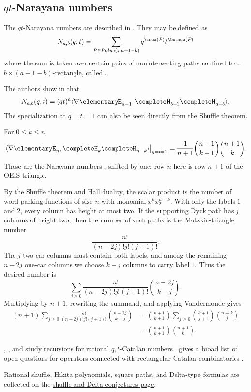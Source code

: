\subsection[narayanaNumbers]{$qt$-Narayana numbers}


The $qt$-Narayana numbers are described in
\cite{AvalDAdderioDukesHicksBorgne2014}.
They may be defined as
\[
N_{a,b}(q,t) = \sum_{P \in Polyo(b,a+1-b)} q^{\area(P)}t^{\bounce(P)}
\]
where the sum is taken over certain pairs of
\hyperref[lgvLemma]{nonintersecting paths} confined to
a $b \times (a+1-b)$-rectangle, called
\label{parallelogramPolyomino}.

The authors show in \cite[Thm.~6.1]{AvalDAdderioDukesHicksBorgne2014} that
\[
N_{a,b}(q,t) =
(qt)^{a} \langle \nabla \elementaryE_{a-1}, \completeH_{b-1} \completeH_{a-b} \rangle.
\]
The specialization at \(q=t=1\) can also be seen directly from the Shuffle
theorem.
\begin{proposition}[Narayana coefficient at \(q=t=1\)]
For \(0\leq k\leq n\),
\[
\left.
\langle \nabla \elementaryE_n,\completeH_k\completeH_{n-k}\rangle
\right|_{q=t=1}
=
\frac{1}{n+1}\binom{n+1}{k+1}\binom{n+1}{k}.
\]
These are the Narayana numbers , shifted by one: row \(n\)
here is row \(n+1\) of the OEIS triangle.
\end{proposition}
\begin{proof*}
By the Shuffle theorem and Hall duality, the scalar product is the number of
\hyperref[wordParkingFunctionDefinition]{word parking functions} of size \(n\)
with monomial \(x_1^k x_2^{n-k}\).
With only the labels \(1\) and \(2\), every column has height at most two.
If the supporting Dyck path has \(j\) columns of height two, then the number
of such paths is the Motzkin-triangle number 
\[
  \frac{n!}{(n-2j)!j!(j+1)!}.
\]
The \(j\) two-car columns must contain both labels, and among the remaining
\(n-2j\) one-car columns we choose \(k-j\) columns to carry label \(1\).
Thus the desired number is
\[
\sum_{j\geq 0}
\frac{n!}{(n-2j)!j!(j+1)!}\binom{n-2j}{k-j}.
\]
Multiplying by \(n+1\), rewriting the summand, and applying Vandermonde gives
\[
\begin{aligned}
(n+1)\sum_{j\geq 0}
\frac{n!}{(n-2j)!j!(j+1)!}\binom{n-2j}{k-j}
&=
\binom{n+1}{k+1}
\sum_{j\geq 0}\binom{k+1}{j+1}\binom{n-k}{j}  \\
&=
\binom{n+1}{k+1}\binom{n+1}{k}.
\end{aligned}
\]
\end{proof*}

, , and 
study recursions for rational $q,t$-Catalan numbers
\cite{GorskyMazinVazirani2020}.   gives a broad list of
open questions for operators connected with rectangular Catalan combinatorics
\cite{Bergeron2017}.

Rational shuffle, Hikita polynomials, square paths, and Delta-type formulas
are collected on the
\hyperref[rationalShuffle]{shuffle and Delta conjectures page}.
